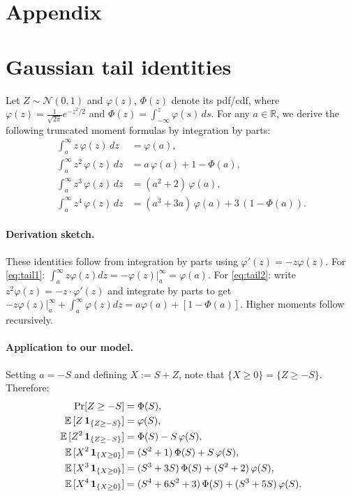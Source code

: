 
\section*{Appendix}
\setcounter{equation}{0}
\renewcommand{\theequation}{A.\arabic{equation}}
\setcounter{lemma}{0}
\renewcommand{\thelemma}{A.\arabic{lemma}}
\setcounter{proposition}{0}
\renewcommand{\theproposition}{A.\arabic{proposition}}

\section{Gaussian tail identities}
\label{app:tails}
Let $Z\sim\mathcal N(0,1)$ and $\varphi(z)$, $\Phi(z)$ denote its pdf/cdf, where $\varphi(z)=\frac{1}{\sqrt{2\pi}}e^{-z^2/2}$ and $\Phi(z)=\int_{-\infty}^z \varphi(s)\,ds$. For any $a\in\mathbb R$, we derive the following truncated moment formulas by integration by parts:
\begin{align}
\int_a^{\infty} z\,\varphi(z)\,dz &= \varphi(a),\label{eq:tail1}\\
\int_a^{\infty} z^2\,\varphi(z)\,dz &= a\,\varphi(a) + 1-\Phi(a),\label{eq:tail2}\\
\int_a^{\infty} z^3\,\varphi(z)\,dz &= (a^2+2)\,\varphi(a),\label{eq:tail3}\\
\int_a^{\infty} z^4\,\varphi(z)\,dz &= (a^3+3a)\,\varphi(a) + 3\,(1-\Phi(a)).\label{eq:tail4}
\end{align}

\paragraph{Derivation sketch.} These identities follow from integration by parts using $\varphi'(z)=-z\varphi(z)$. For \eqref{eq:tail1}: $\int_a^\infty z\varphi(z)dz = -\varphi(z)\big|_a^\infty = \varphi(a)$. For \eqref{eq:tail2}: write $z^2\varphi(z)=-z\cdot\varphi'(z)$ and integrate by parts to get $-z\varphi(z)\big|_a^\infty + \int_a^\infty\varphi(z)dz = a\varphi(a) + [1-\Phi(a)]$. Higher moments follow recursively.

\paragraph{Application to our model.} Setting $a=-S$ and defining $X:=S+Z$, note that $\{X\ge 0\} = \{Z \ge -S\}$. Therefore:
\begin{align}
\Pr[Z\ge -S] &= \Phi(S),\\
{\mathbb{E}}\,[Z\,\mathbf 1_{\{Z\ge -S\}}] &= \varphi(S),\\
{\mathbb{E}}\,[Z^2\,\mathbf 1_{\{Z\ge -S\}}] &= \Phi(S) - S\,\varphi(S),\\
{\mathbb{E}}\,[X^2\,\mathbf 1_{\{X\ge 0\}}] &= (S^2+1)\,\Phi(S) + S\,\varphi(S),\\
{\mathbb{E}}\,[X^3\,\mathbf 1_{\{X\ge 0\}}] &= (S^3+3S)\,\Phi(S) + (S^2+2)\,\varphi(S),\\
{\mathbb{E}}\,[X^4\,\mathbf 1_{\{X\ge 0\}}] &= (S^4+6S^2+3)\,\Phi(S) + (S^3+5S)\,\varphi(S).
\end{align}

